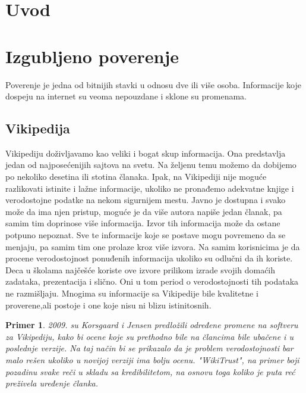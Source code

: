 \documentclass[a4paper]{article}
\newtheorem{primer}{Primer}[section]
\begin{document}
\tableofcontents

\newpage

\section{Uvod}
\label{sec:uvod}

\section{Izgubljeno poverenje}

Poverenje je jedna od  bitnijih stavki u odnosu dve ili više osoba. Informacije koje dospeju na internet su veoma nepouzdane i sklone su promenama.

\subsection{Vikipedija}
\label{subsec:podnaslovIP1}

Vikipediju doživljavamo kao veliki i bogat skup informacija. Ona predstavlja jedan od najposećenijih sajtova na svetu. Na željenu temu možemo da dobijemo po nekoliko desetina ili stotina članaka. Ipak, na Vikipediji nije moguće razlikovati istinite i lažne informacije, ukoliko ne pronađemo adekvatne knjige i verodostojne podatke na nekom sigurnijem mestu. Javno je dostupna i svako može da ima njen pristup, moguće je da više autora napiše jedan članak, pa samim tim doprinose više informacija. Izvor tih informacija može da ostane potpuno nepoznat. Sve te informacije koje se postave mogu povremeno da se menjaju, pa samim tim one prolaze kroz više izvora. Na samim korisnicima je da procene verodostojnost ponuđenih informacija ukoliko su odlučni da ih koriste.  Deca u školama najčešće koriste ove izvore prilikom izrade svojih domaćih zadataka, prezentacija i slično. Oni u tom period o verodostojnosti tih podataka ne razmišljaju. Mnogima su informacije sa Vikipedije bile kvalitetne i proverene,ali postoje i one koje nisu ni blizu istinitosnih.
\begin{primer}
2009.  su  Korsgaard i Jensen predložili  određene promene na softveru za Vikipediju, kako bi ocene koje su prethodno bile na člancima bile ubačene i u poslednje verzije. Na taj način bi se prikazalo da je problem verodostojnosti bar malo rešen ukoliko u novijoj verziji ima bolju ocenu. "WikiTrust", na primer boji pozadinu svake reči u skladu sa kredibilitetom, na osnovu toga koliko je puta reć preživela uređenje članka. \cite{tInOnl}
\end{primer}
\end{document}
